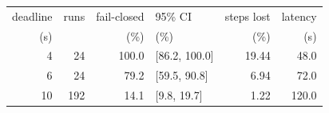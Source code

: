 {\setlength{\tabcolsep}{4pt}\renewcommand{\arraystretch}{1.15}
\begin{tabular}{@{}rrrlrr@{}}
\toprule
deadline & runs & fail-closed & 95\% CI & steps lost & latency \\
(s) & & (\%) & (\%) & (\%) & (s) \\
\midrule
4 & 24 & 100.0 & [86.2, 100.0] & 19.44 & 48.0 \\
6 & 24 & 79.2 & [59.5, 90.8] & 6.94 & 72.0 \\
10 & 192 & 14.1 & [9.8, 19.7] & 1.22 & 120.0 \\
\bottomrule
\end{tabular}}
